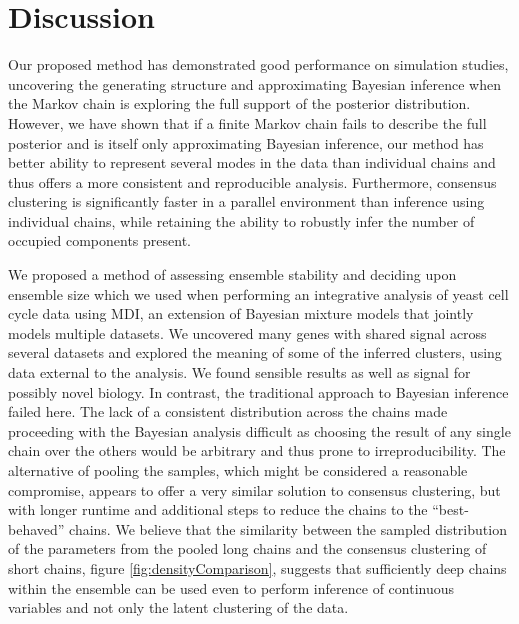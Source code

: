 \documentclass{bmcart}
\begin{document}
\section*{Discussion}
Our proposed method has demonstrated good performance on simulation studies, uncovering the generating structure and approximating Bayesian inference when the Markov chain is exploring the full support of the posterior distribution. However, we have shown that if a finite Markov chain fails to describe the full posterior and is itself only approximating Bayesian inference, our method has better ability to represent several modes in the data than individual chains and thus offers a more consistent and reproducible analysis. Furthermore, consensus clustering is significantly faster in a parallel environment than inference using individual chains, while retaining the ability to robustly infer the number of occupied components present. 

We proposed a method of assessing ensemble stability and deciding upon ensemble size which we used when performing an integrative analysis of yeast cell cycle data using MDI, an extension of Bayesian mixture models that jointly models multiple datasets. 
We uncovered many genes with shared signal across several datasets and explored the meaning of some of the inferred clusters, using data external to the analysis. We found sensible results as well as signal for possibly novel biology. In contrast, the traditional approach to Bayesian inference failed here. The lack of a consistent distribution across the chains made proceeding with the Bayesian analysis difficult as choosing the result of any single chain over the others would be arbitrary and thus prone to irreproducibility. The alternative of pooling the samples, which might be considered a reasonable compromise, appears to offer a very similar solution to consensus clustering, but with longer runtime and additional steps to reduce the chains to the ``best-behaved'' chains. We believe that the similarity between the sampled distribution of the parameters from the pooled long chains and the consensus clustering of short chains, figure \ref{fig:densityComparison}, suggests that sufficiently deep chains within the ensemble can be used even to perform inference of continuous variables and not only the latent clustering of the data.
\end{document}
